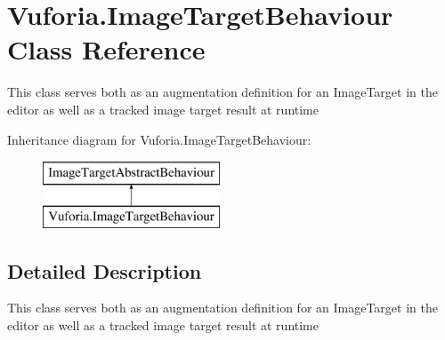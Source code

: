 \hypertarget{class_vuforia_1_1_image_target_behaviour}{}\section{Vuforia.\+Image\+Target\+Behaviour Class Reference}
\label{class_vuforia_1_1_image_target_behaviour}


This class serves both as an augmentation definition for an Image\+Target in the editor as well as a tracked image target result at runtime  


Inheritance diagram for Vuforia.\+Image\+Target\+Behaviour\+:\begin{figure}[H]
\begin{center}
\leavevmode
\includegraphics[height=2.000000cm]{class_vuforia_1_1_image_target_behaviour}
\end{center}
\end{figure}


\subsection{Detailed Description}
This class serves both as an augmentation definition for an Image\+Target in the editor as well as a tracked image target result at runtime 

